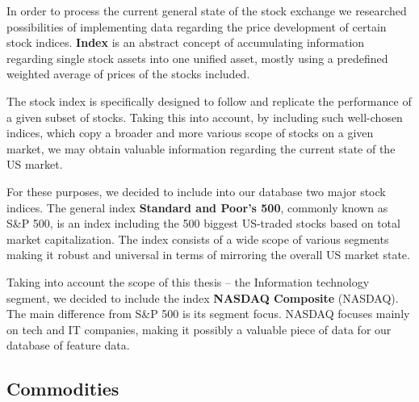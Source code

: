 In order to process the current general state of the stock exchange we researched possibilities of
implementing data regarding the price development of certain stock indices. \textbf{Index} is an abstract 
concept of accumulating information regarding single stock assets into one unified asset, mostly using a predefined
weighted average of prices of the stocks included.
\par
The stock index is specifically designed to follow and replicate the performance of a given subset of stocks. Taking this into account,
by including such well-chosen indices, which copy a broader and more various scope of stocks on a given market, we may obtain valuable
information regarding the current state of the US market.
\par
For these purposes, we decided to include into our database two major stock indices. The general index \textbf{Standard and Poor's 500}, commonly
known as S\&P 500, is an index including the 500 biggest US-traded stocks based on total market capitalization. The index consists of a wide scope of various
segments making it robust and universal in terms of mirroring the overall US market state.
\par
Taking into account the scope of this thesis – the Information technology segment, we decided to include the index \textbf{NASDAQ Composite} (NASDAQ). The main
difference from S\&P 500 is its segment focus. NASDAQ focuses mainly on tech and IT companies, making it possibly a valuable piece of data for our database of feature data.  

\subsection{Commodities}

